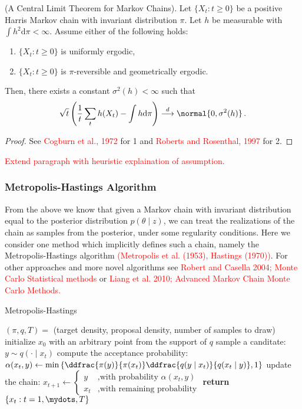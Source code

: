 \begin{theorem}{(A Central Limit Theorem for Markov Chains).}
  Let $\{X_t: t \geqslant 0 \}$ be a positive Harris Markov chain with invariant distribution $\pi$.
  Let $h$ be measurable with $\int h^2 \mathrm{d}\pi < \infty$.
  Assume either of the following holds:
  \begin{enumerate}
    \item $\{X_t: t \geqslant 0\}$ is uniformly ergodic,
    \item $\{X_t: t \geqslant 0\}$ is $\pi$-reversible and geometrically ergodic.
  \end{enumerate}
  Then, there exists a constant $\sigma^2(h) < \infty$ such that
  \begin{align}
    \sqrt{t}\left(\frac{1}{t}\sum_t h(X_t) - \int h \mathrm{d}\pi \right) \overset{d}{\longrightarrow} \normal{0, \sigma^2(h)} \,.
  \end{align}
\end{theorem}
\begin{proof}
  See \textcolor{red}{Cogburn et al., 1972} for 1 and \textcolor{red}{Roberts and Rosenthal, 1997} for 2.
\end{proof}
\textcolor{red}{Extend paragraph with heuristic explaination of assumption.}

\subsubsection*{Metropolis-Hastings Algorithm}
From the above we know that given a Markov chain with invariant distribution equal to the posterior distribution $p(\theta \mid z)$, we can treat the realizations of the chain as samples from the posterior, under some regularity conditions.
Here we consider one method which implicitly defines such a chain, namely the Metropolis-Hastings algorithm \textcolor{red}{(Metropolis et al. (1953), Hastings (1970))}.
For other approaches and more novel algorithms see \textcolor{red}{Robert and Casella 2004; Monte Carlo Statistical methods} or \textcolor{red}{Liang et al. 2010; Advanced Markov Chain Monte Carlo Methods.}

\begin{algorithm}
\caption{Metropolis-Hastings}\label{alg:metropolis-hastings}
\begin{algorithmic}[1]
  \Require $(\pi, q, T) =$ (target density, proposal density, number of samples to draw)
\State initialize $x_0$ with an arbitrary point from the support of $q$
  \State sample a canditate: $y \sim q(\cdot \mid x_t)$
  \State compute the acceptance probability: $\alpha(x_t, y) \gets \min\left\{ \ddfrac{\pi(y)}{\pi(x_t)} \ddfrac{q(y \mid x_t)}{q(x_t \mid y)}, 1\right\}$
  \State update the chain: $x_{t+1} \gets \begin{cases} y &\mbox{,with probability } \alpha(x_t, y)\\ x_t &\mbox{,with remaining probability} \end{cases}$
\EndFor{}
\State \textbf{return} $\{x_t : t = 1,\mydots,T\}$
\end{algorithmic}
\end{algorithm}

